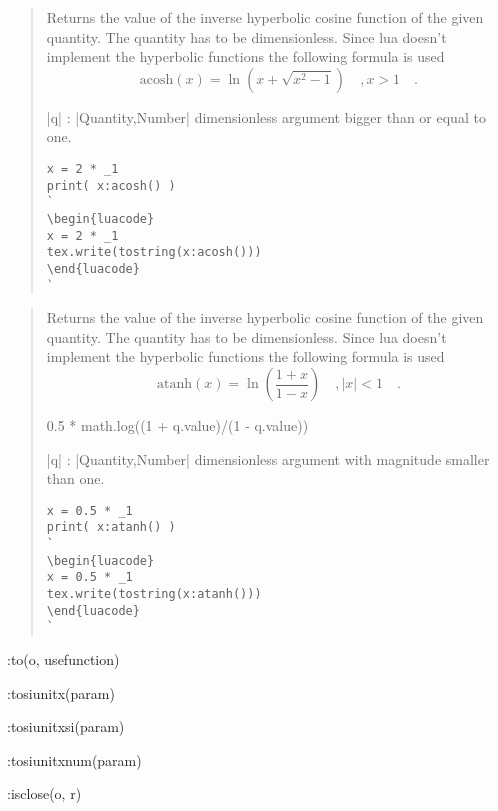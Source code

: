 \documentclass{ltxdoc}
\begin{document}
\begin{quote}
  Returns the value of the inverse hyperbolic cosine function of the given quantity. The quantity has to be dimensionless. Since lua doesn't implement the hyperbolic functions the following formula is used 
  $$
    \text{acosh}(x) = \ln\left( x + \sqrt{x^2 - 1} \right)  \quad, x > 1 \quad.
  $$


  \begin{description}
  \item |q| : |Quantity,Number| dimensionless argument bigger than or equal to one.
  \end{description}

\begin{lstlisting}
x = 2 * _1
print( x:acosh() )
`
\begin{luacode}
x = 2 * _1
tex.write(tostring(x:acosh()))
\end{luacode}
`
\end{lstlisting}

\end{quote}



\begin{quote}
  Returns the value of the inverse hyperbolic cosine function of the given quantity. The quantity has to be dimensionless. Since lua doesn't implement the hyperbolic functions the following formula is used 
  $$
    \text{atanh}(x) = \ln\left( \frac{1 + x}{1 - x} \right)  \quad, \mid x\mid < 1 \quad.
  $$

  0.5 * math.log((1 + q.value)/(1 - q.value))

  \begin{description}
  \item |q| : |Quantity,Number| dimensionless argument with magnitude smaller than one.
  \end{description}

\begin{lstlisting}
x = 0.5 * _1
print( x:atanh() )
`
\begin{luacode}
x = 0.5 * _1
tex.write(tostring(x:atanh()))
\end{luacode}
`
\end{lstlisting}

\end{quote}




\newpage



:to(o, usefunction)

:tosiunitx(param)

:tosiunitxsi(param)

:tosiunitxnum(param)

:isclose(o, r)
\end{document}
